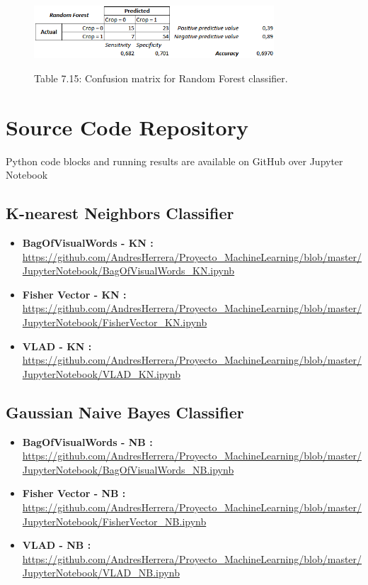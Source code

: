 \documentclass[12pt]{article}
\numberwithin{equation}{section}
\numberwithin{table}{section}
\numberwithin{figure}{section}
\begin{document}
\begin{figure}[H] \centering
	\caption*{Table 7.15: Confusion matrix for Random Forest classifier. }
	\includegraphics[width=0.8\textwidth]{m15.png}
	\label{m15}
\end{figure}




\section{Source Code Repository}

Python code blocks and running results are available on GitHub over Jupyter Notebook

\subsection{K-nearest Neighbors Classifier }

\begin{itemize}
	\item {\textbf{BagOfVisualWords - KN :} } \url{https://github.com/AndresHerrera/Proyecto_MachineLearning/blob/master/JupyterNotebook/BagOfVisualWords_KN.ipynb}
	
	\item {\textbf{Fisher Vector - KN :} } \url{	https://github.com/AndresHerrera/Proyecto_MachineLearning/blob/master/JupyterNotebook/FisherVector_KN.ipynb}
	
	\item {\textbf{VLAD - KN :} } \url{	https://github.com/AndresHerrera/Proyecto_MachineLearning/blob/master/JupyterNotebook/VLAD_KN.ipynb}
		
\end{itemize}

\subsection{Gaussian Naive Bayes Classifier }

\begin{itemize}
	\item {\textbf{BagOfVisualWords - NB :} } \url{https://github.com/AndresHerrera/Proyecto_MachineLearning/blob/master/JupyterNotebook/BagOfVisualWords_NB.ipynb}
	
	\item {\textbf{Fisher Vector - NB :} } \url{	https://github.com/AndresHerrera/Proyecto_MachineLearning/blob/master/JupyterNotebook/FisherVector_NB.ipynb}
	
	\item {\textbf{VLAD - NB :} } \url{	https://github.com/AndresHerrera/Proyecto_MachineLearning/blob/master/JupyterNotebook/VLAD_NB.ipynb}
	
\end{itemize}
\end{document}
